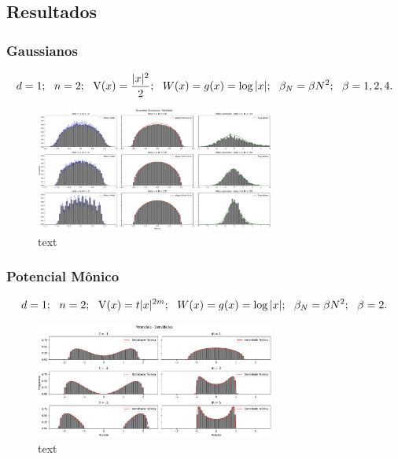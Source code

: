 \subsection{Resultados}
\begin{frame}
	\frametitle{Gaussianos}
	\begin{equation}
		d = 1; \ \  n = 2; \ \ \V(x)=\frac{|x|^2}{2}; \ \ W(x) = g(x) = \log{|x|}; \ \ \beta_N = \beta N^2; \ \ \beta = 1,2,4.
		\label{Equation: Parametros Gaussian}
	\end{equation}
	\begin{figure}
		\centering
		\includegraphics[width=0.7\textwidth]{./media/Results/validationGaussianTracy}	
		\caption{text}
	\end{figure}
\end{frame}
\begin{frame}
	\frametitle{Potencial Mônico}
	\begin{equation}
		d = 1; \ \  n = 2; \ \ \V(x)= t |x|^{2m}; \ \ W(x) = g(x) = \log{|x|}; \ \ \beta_N = \beta N^2; \ \ \beta = 2.
		\label{Equation: Parametros Monico}
	\end{equation}
	\begin{figure}
		\centering
		\includegraphics[width=0.7\textwidth]{./media/Results/validationQuarticMonic-alt}	
		\caption{text}
	\end{figure}
\end{frame}
